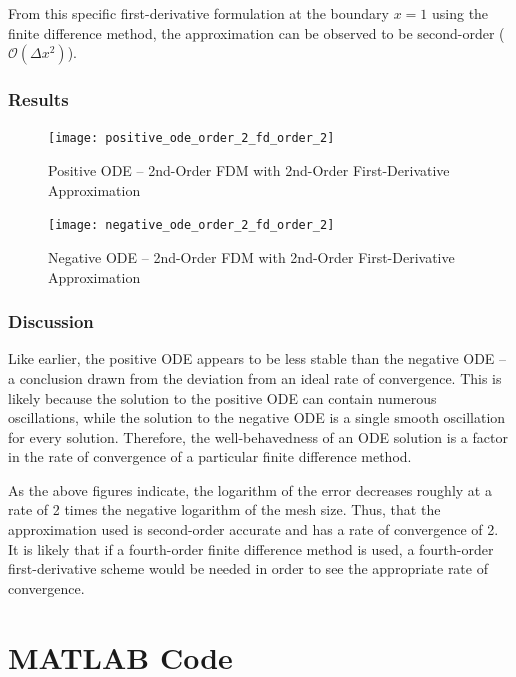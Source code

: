 \documentclass[10pt, reqno]{article}		%
\numberwithin{equation}{section}
\begin{document}
From this specific first-derivative formulation at the boundary $x = 1$ using the finite difference method, the approximation can be observed to be second-order ($\mathcal{O}(\Delta x^2)$).

\subsubsection{Results}

\begin{figure}[H]
	\begin{center}
		\texttt{[image: positive\_ode\_order\_2\_fd\_order\_2]}
		\caption{Positive ODE -- 2nd-Order FDM with 2nd-Order First-Derivative Approximation}
	\end{center}
\end{figure}

\begin{figure}[H]
	\begin{center}
		\texttt{[image: negative\_ode\_order\_2\_fd\_order\_2]}
		\caption{Negative ODE -- 2nd-Order FDM with 2nd-Order First-Derivative Approximation}
	\end{center}
\end{figure}

\subsubsection{Discussion}

Like earlier, the positive ODE appears to be less stable than the negative ODE -- a conclusion drawn from the deviation from an ideal rate of convergence. This is likely because the solution to the positive ODE can contain numerous oscillations, while the solution to the negative ODE is a single smooth oscillation for every solution. Therefore, the well-behavedness of an ODE solution is a factor in the rate of convergence of a particular finite difference method.

As the above figures indicate, the logarithm of the error decreases roughly at a rate of 2 times the negative logarithm of the mesh size. Thus, that the approximation used is second-order accurate and has a rate of convergence of 2. It is likely that if a fourth-order finite difference method is used, a fourth-order first-derivative scheme would be needed in order to see the appropriate rate of convergence.

\newpage

\section{MATLAB Code}
\end{document}
